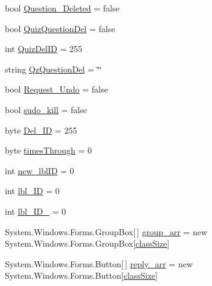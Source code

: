 \begin{DoxyCompactItemize}
\item 
bool \hyperlink{class_sr_p___classroom_inq_1_1frm_classrrom_inq_a8f54ae3a0ea7bb9dafed984a53155fd8}{\-Question\-\_\-\-Deleted} = false
\item 
bool \hyperlink{class_sr_p___classroom_inq_1_1frm_classrrom_inq_aa1c6ba1dda756081aba5b3cfea87b09d}{\-Quiz\-Question\-Del} = false
\item 
int \hyperlink{class_sr_p___classroom_inq_1_1frm_classrrom_inq_a2221a860fdb3bc2837b3ca3c0cee182c}{\-Quiz\-Del\-I\-D} = 255
\item 
string \hyperlink{class_sr_p___classroom_inq_1_1frm_classrrom_inq_a1fe88369748706492ccc7292a0e47331}{\-Qz\-Question\-Del} = \char`\"{}\char`\"{}
\item 
bool \hyperlink{class_sr_p___classroom_inq_1_1frm_classrrom_inq_acb5bab8dcbcbfc8ed7a5b260ddba84e3}{\-Request\-\_\-\-Undo} = false
\item 
bool \hyperlink{class_sr_p___classroom_inq_1_1frm_classrrom_inq_a3ac2217a30904b65be786ee00a312fea}{sudo\-\_\-kill} = false
\item 
byte \hyperlink{class_sr_p___classroom_inq_1_1frm_classrrom_inq_a9874b3534409b79a483f08f2aa03668d}{\-Del\-\_\-\-I\-D} = 255
\item 
byte \hyperlink{class_sr_p___classroom_inq_1_1frm_classrrom_inq_ab730336bf81938256d6f20922c15484b}{times\-Through} = 0
\item 
int \hyperlink{class_sr_p___classroom_inq_1_1frm_classrrom_inq_a561cfd5c0d34d4adcb14aee4efc01643}{new\-\_\-lbl\-I\-D} = 0
\item 
int \hyperlink{class_sr_p___classroom_inq_1_1frm_classrrom_inq_a15d44adc56e5e6523bfadd27d9966935}{lbl\-\_\-\-I\-D} = 0
\item 
int \hyperlink{class_sr_p___classroom_inq_1_1frm_classrrom_inq_a5d14fbec9e02ebe6942d26ae8ed53d3b}{lbl\-\_\-\-I\-D\-\_} = 0
\item 
\-System.\-Windows.\-Forms.\-Group\-Box\mbox{[}$\,$\mbox{]} \hyperlink{class_sr_p___classroom_inq_1_1frm_classrrom_inq_a68d2b307c87e71592f6e170c9ce2aad2}{group\-\_\-arr} = new \-System.\-Windows.\-Forms.\-Group\-Box\mbox{[}\hyperlink{class_sr_p___classroom_inq_1_1frm_classrrom_inq_a78d9aab335edfe53d39036b9d89928a8}{class\-Size}\mbox{]}
\item 
\-System.\-Windows.\-Forms.\-Button\mbox{[}$\,$\mbox{]} \hyperlink{class_sr_p___classroom_inq_1_1frm_classrrom_inq_a46ee30d934a5219840e4381a66728f0f}{reply\-\_\-arr} = new \-System.\-Windows.\-Forms.\-Button\mbox{[}\hyperlink{class_sr_p___classroom_inq_1_1frm_classrrom_inq_a78d9aab335edfe53d39036b9d89928a8}{class\-Size}\mbox{]}

\end{DoxyCompactItemize}
